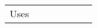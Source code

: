 \begin{landscape}
\begin{center}
\begin{longtable}{
|m{2cm}
|m{1cm}
|m{1cm}
|m{1cm}
|m{1cm}
|m{3cm}
|m{5cm}
|
}



Uses



\end{longtable}
\end{center}
\end{landscape}
